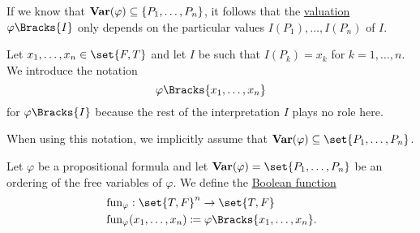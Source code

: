 \begin{remark}\label{rem:propositional_formula_valuation_without_variable_assignment}
  If we know that \( \operatorname{\mathbf{Var}}(\varphi) \subseteq \{ P_1, \ldots, P_n \} \), it follows that the \hyperref[def:first_order_valuation/formula_valuation]{valuation} \( \varphi\Bracks{I} \) only depends on the particular values \( I(P_1), \ldots, I(P_n) \) of \( I \).

  Let \( x_1, \ldots, x_n \in \set{ F, T } \) and let \( I \) be such that \( I(P_k) = x_k \) for \( k = 1, \ldots, n \). We introduce the notation
  \begin{equation}\label{eq:rem:propositional_formula_valuation_without_variable_assignment/short}
    \varphi\Bracks{x_1, \ldots, x_n}
  \end{equation}
  for \( \varphi\Bracks{I} \) because the rest of the interpretation \( I \) plays no role here.

  When using this notation, we implicitly assume that \( \boldop{Var}(\varphi) \subseteq \set{ P_1, \ldots, P_n } \).
\end{remark}

\begin{definition}\label{def:propositional_formula_induced_function}
  Let \( \varphi \) be a propositional formula and let \( \boldop{Var}(\varphi) = \set{ P_1, \ldots, P_n } \) be an ordering of the free variables of \( \varphi \). We define the \hyperref[def:boolean_function]{Boolean function}
  \begin{equation}\label{eq:def:propositional_formula_induced_function}
    \begin{split}
      &\fun_\varphi: \set{ T, F }^n \to \set{ T, F } \\
      &\fun_\varphi(x_1, \ldots, x_n) \coloneqq \varphi\Bracks{x_1, \ldots, x_n}.
    \end{split}
  \end{equation}
\end{definition}

